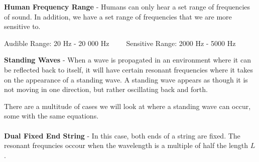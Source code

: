 \documentclass{article}
\begin{document}
\noindent\textbf{Human Frequency Range} - Humans can only hear a set range of frequencies of sound. In addition, we have a set range of frequencies that we are more sensitive to.\\
\vspace{-10pt}
\begin{center}
	Audible Range: 20 Hz - 20 000 Hz $\:\:\:\:\:\:\:\:$ Sensitive Range: 2000 Hz - 5000 Hz
\end{center}
\vspace{\baselineskip}
\textbf{Standing Waves} - When a wave is propagated in an environment where it can be reflected back to itself, it will have certain resonant frequencies where it takes on the appearance of a standing wave. A standing wave appears as though it is not moving in one direction, but rather oscillating back and forth.
\begin{center}
	
	\hspace*{-8pt} 
\end{center}
There are a multitude of cases we will look at where a standing wave can occur, some with the same equations.\\
\\
\textbf{Dual Fixed End String} - In this case, both ends of a string are fixed. The resonant frequncies occour when the wavelength is a multiple of half the length $L$.
\end{document}
